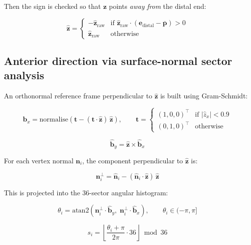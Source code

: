 \documentclass[11pt, a4paper]{article}
\begin{document}
Then the sign is checked so that $\hat{\bm{z}}$ points \emph{away from} the
distal end:

\begin{equation}
  \hat{\bm{z}} =
  \begin{cases}
    -\hat{\bm{z}}_{\mathrm{raw}}
      & \text{if } \hat{\bm{z}}_{\mathrm{raw}} \cdot
        (\bm{e}_{\mathrm{distal}} - \bar{\bm{p}}) > 0 \\
    \hat{\bm{z}}_{\mathrm{raw}} & \text{otherwise}
  \end{cases}
\end{equation}

\subsection{Anterior direction via surface-normal sector analysis}

An orthonormal reference frame perpendicular to $\hat{\bm{z}}$ is built using
Gram-Schmidt:

\begin{equation}
  \hat{\bm{b}}_x = \mathrm{normalise}\!\left(
    \bm{t} - (\bm{t} \cdot \hat{\bm{z}})\,\hat{\bm{z}}
  \right),
  \qquad \bm{t} =
  \begin{cases}
    (1,0,0)^\top & \text{if } |\hat{z}_x| < 0.9 \\
    (0,1,0)^\top & \text{otherwise}
  \end{cases}
\end{equation}

\begin{equation}
  \hat{\bm{b}}_y = \hat{\bm{z}} \times \hat{\bm{b}}_x
\end{equation}

For each vertex normal $\hat{\bm{n}}_i$, the component perpendicular to
$\hat{\bm{z}}$ is:

\begin{equation}
  \bm{n}_i^\perp = \hat{\bm{n}}_i - (\hat{\bm{n}}_i \cdot \hat{\bm{z}})\,\hat{\bm{z}}
\end{equation}

This is projected into the 36-sector angular histogram:

\begin{equation}
  \theta_i = \mathrm{atan2}\!\left(
    \bm{n}_i^\perp \cdot \hat{\bm{b}}_y,\;
    \bm{n}_i^\perp \cdot \hat{\bm{b}}_x
  \right), \qquad \theta_i \in (-\pi, \pi]
\end{equation}

\begin{equation}
  s_i = \left\lfloor \frac{\theta_i + \pi}{2\pi} \cdot 36 \right\rfloor
        \bmod 36
\end{equation}
\end{document}
